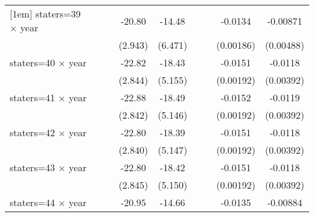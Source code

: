 {\begin{longtable}{l*{8}{c}}
[1em]
staters=39 $\times$ year&                     &                     &      -20.80\sym{***}&      -14.48\sym{**} &                     &                     &     -0.0134\sym{***}&    -0.00871\sym{*}  \\
                    &                     &                     &     (2.943)         &     (6.471)         &                     &                     &   (0.00186)         &   (0.00488)         \\
[1em]
staters=40 $\times$ year&                     &                     &      -22.82\sym{***}&      -18.43\sym{***}&                     &                     &     -0.0151\sym{***}&     -0.0118\sym{***}\\
                    &                     &                     &     (2.844)         &     (5.155)         &                     &                     &   (0.00192)         &   (0.00392)         \\
[1em]
staters=41 $\times$ year&                     &                     &      -22.88\sym{***}&      -18.49\sym{***}&                     &                     &     -0.0152\sym{***}&     -0.0119\sym{***}\\
                    &                     &                     &     (2.842)         &     (5.146)         &                     &                     &   (0.00192)         &   (0.00392)         \\
[1em]
staters=42 $\times$ year&                     &                     &      -22.80\sym{***}&      -18.39\sym{***}&                     &                     &     -0.0151\sym{***}&     -0.0118\sym{***}\\
                    &                     &                     &     (2.840)         &     (5.147)         &                     &                     &   (0.00192)         &   (0.00392)         \\
[1em]
staters=43 $\times$ year&                     &                     &      -22.80\sym{***}&      -18.42\sym{***}&                     &                     &     -0.0151\sym{***}&     -0.0118\sym{***}\\
                    &                     &                     &     (2.845)         &     (5.150)         &                     &                     &   (0.00192)         &   (0.00392)         \\
[1em]
staters=44 $\times$ year&                     &                     &      -20.95\sym{***}&      -14.66\sym{**} &                     &                     &     -0.0135\sym{***}&    -0.00884\sym{*}  \\

\end{longtable}}
